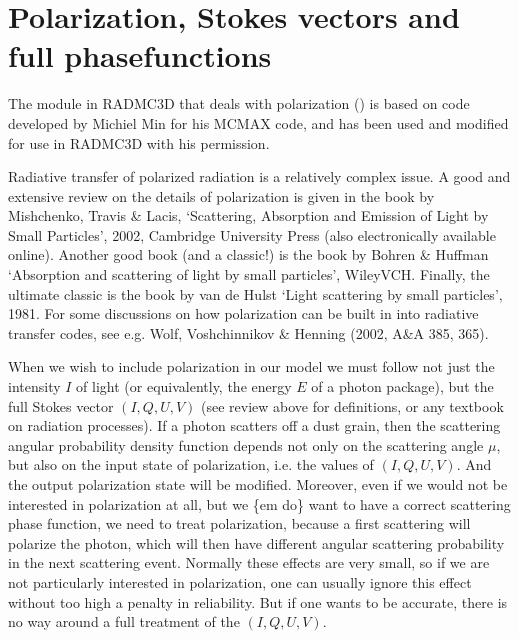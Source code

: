 \documentclass[letterpaper,10pt,english]{sphinxmanual}
\begin{document}
\section{Polarization, Stokes vectors and full phase\sphinxhyphen{}functions}
\label{\detokenize{dustradtrans:polarization-stokes-vectors-and-full-phase-functions}}\label{\detokenize{dustradtrans:sec-polarized-scattering}}
The module in RADMC\sphinxhyphen{}3D that deals with polarization
() is based on code developed by Michiel Min for his
MCMAX code, and has been used and modified for use in RADMC\sphinxhyphen{}3D with his
permission.

Radiative transfer of polarized radiation is a relatively complex issue. A good
and extensive review on the details of polarization is given in the book by
Mishchenko, Travis \& Lacis, ‘Scattering, Absorption and Emission of Light by
Small Particles’, 2002, Cambridge University Press (also electronically
available on\sphinxhyphen{}line). Another good book (and a classic!)  is the book by Bohren \&
Huffman ‘Absorption and scattering of light by small particles’,
Wiley\sphinxhyphen{}VCH. Finally, the ultimate classic is the book by van de Hulst ‘Light
scattering by small particles’, 1981. For some discussions on how polarization
can be built in into radiative transfer codes, see e.g. Wolf, Voshchinnikov \&
Henning (2002, A\&A 385, 365).

When we wish to include polarization in our model we must follow not just the
intensity \(I\) of light (or equivalently, the energy \(E\) of a photon
package), but the full Stokes vector \((I,Q,U,V)\) (see review above for
definitions, or any textbook on radiation processes). If a photon scatters off a
dust grain, then the scattering angular probability density function depends not
only on the scattering angle \(\mu\), but also on the input state of
polarization, i.e. the values of \((I,Q,U,V)\). And the output polarization
state will be modified. Moreover, even if we would not be interested in
polarization at all, but we \{em do\} want to have a correct scattering phase
function, we need to treat polarization, because a first scattering will
polarize the photon, which will then have different angular scattering
probability in the next scattering event. Normally these effects are very small,
so if we are not particularly interested in polarization, one can usually ignore
this effect without too high a penalty in reliability. But if one wants to be
accurate, there is no way around a full treatment of the \((I,Q,U,V)\).
\end{document}
